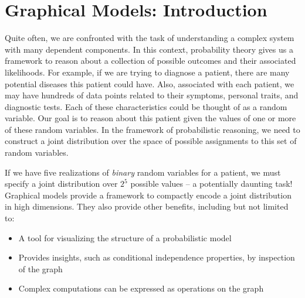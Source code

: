 \documentclass[12pt]{report}
\begin{document}

\maketitle

\vspace*{.1in}
\setlength{\parindent}{0cm}


\section{Graphical Models: Introduction}
Quite often, we are confronted with the task of understanding a complex system
with many dependent components. In this context, probability theory
gives us a framework to reason about a collection of possible outcomes
and their associated likelihoods. For example, if we are trying to
diagnose a patient, there are many potential diseases this patient
could have. Also, associated with each patient, we may have hundreds
of data points related to their symptoms, personal traits, and
diagnostic tests. Each of these characteristics could be thought of as
a random variable. Our goal is to reason about this patient given the
values of one or more of these random variables. In the framework of
probabilistic reasoning, we need to construct a joint distribution
over the space of possible assignments to this set of random
variables. 

If we have five realizations of \emph{binary} random variables for a patient, we must specify a joint
distribution over $2^5$ possible values -- a potentially daunting task! Graphical models provide a
framework to compactly encode a joint distribution in high
dimensions. They also provide other benefits, including but not
limited to:
\begin{itemize}
\item A tool for visualizing the structure of a probabilistic model
\item Provides insights, such as conditional independence properties, by inspection of the graph
\item Complex computations can be expressed as operations on the graph
\end{itemize}
\end{document}
